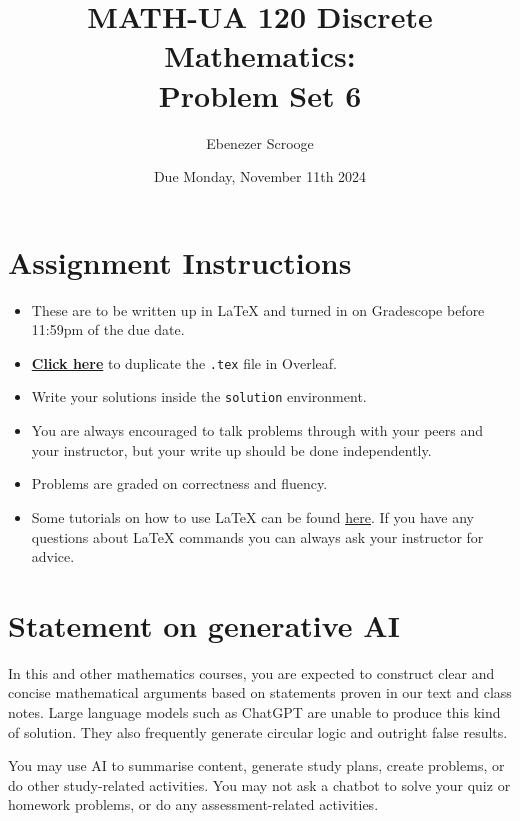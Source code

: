 \documentclass{article}
\title{\textbf{MATH-UA 120 Discrete Mathematics: \\ Problem Set 6}}
\author{%
    Ebenezer Scrooge %
}
\date{Due Monday, November 11th 2024} %
\theoremstyle{definition}
\begin{document}
\maketitle %

\vfill

\section*{Assignment Instructions}

\begin{itemize}
    \item These are to be written up in \LaTeX{} and turned in on Gradescope before 11:59pm of the due date.
    \item \href{https://bit.ly/3AWJyvt}{\textbf{Click here}} to duplicate the \texttt{.tex} file in Overleaf.
    \item Write your solutions inside the \texttt{solution} environment.
    \item You are always encouraged to talk problems through with your peers and your instructor, but your write up should be done independently.
    \item Problems are graded on correctness and fluency.
    \item Some tutorials on how to use \LaTeX{} can be found \href{https://www.overleaf.com/learn/latex/Tutorials}{\underline{here}}. If you have any questions about \LaTeX{} commands you can always ask your instructor for advice.
\end{itemize}

\vfill

\section*{Statement on generative AI}

In this and other mathematics courses, you are expected to construct clear and concise mathematical arguments based on statements proven in our text and class notes. Large language models such as ChatGPT are unable to produce this kind of solution. They also frequently generate circular logic and outright false results.
 
You may use AI to summarise content, generate study plans, create problems, or do other study-related activities. You may not ask a chatbot to solve your quiz or homework problems, or do any assessment-related activities.
 
\end{document}
